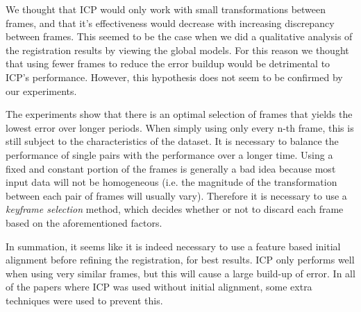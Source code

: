 \documentclass[a4paper]{article}
\begin{document}
We thought that \ac{ICP} would only work with small transformations between frames, and that it's effectiveness would decrease with increasing discrepancy between frames. This seemed to be the case when we did a qualitative analysis of the registration results by viewing the global models. For this reason we thought that using fewer frames to reduce the error buildup would be detrimental to \ac{ICP}'s performance. However, this hypothesis does not seem to be confirmed by our experiments.

The experiments show that there is an optimal selection of frames that yields the lowest error over longer periods. When simply using only every n-th frame, this is still subject to the characteristics of the dataset. It is necessary to balance the performance of single pairs with the performance over a longer time. Using a fixed and constant portion of the frames is generally a bad idea because most input data will not be homogeneous (i.e. the magnitude of the transformation between each pair of frames will usually vary). Therefore it is necessary to use a \emph{keyframe selection} method, which decides whether or not to discard each frame based on the aforementioned factors.

In summation, it seems like it is indeed necessary to use a feature based initial alignment before refining the registration, for best results. \ac{ICP} only performs well when using very similar frames, but this will cause a large build-up of error. In all of the papers where \ac{ICP} was used without initial alignment, some extra techniques were used to prevent this.


{}

\end{document}
